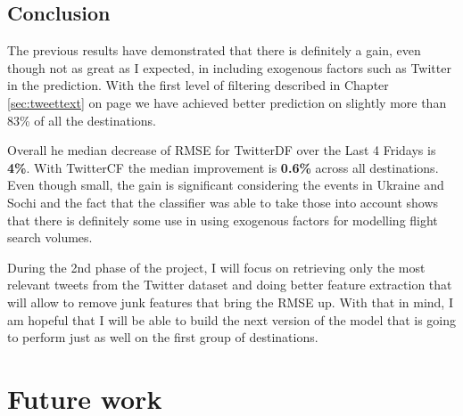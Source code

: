 \documentclass[minf,frontabs,twoside,singlespacing,parskip]{infthesis}
\begin{document}
%
\newpage
\section{Conclusion}

The previous results have demonstrated that there is definitely a gain, even though not as great as I expected, in including exogenous factors such as Twitter in the prediction. With the first level of filtering described in Chapter \ref{sec:tweettext} on page \pageref{sec:tweettext} we have achieved better prediction on slightly more than 83\% of all the destinations.  


Overall he median decrease of RMSE for TwitterDF over the Last 4 Fridays is \textbf{4\%}. With TwitterCF the median improvement is \textbf{0.6\%} across all destinations. Even though small, the gain is significant considering the events in Ukraine and Sochi and the fact that the classifier was able to take those into account shows that there is definitely some use in using exogenous factors for modelling flight search volumes. 

During the 2nd phase of the project, I will focus on retrieving only the most relevant tweets from the Twitter dataset and doing better feature extraction that will allow to remove junk features that bring the RMSE up. With that in mind, I am hopeful that I will be able to build the next version of the model that is going to perform just as well on the first group of destinations. 


\chapter{Future work}
\label{chap:future-work}



\end{document}
